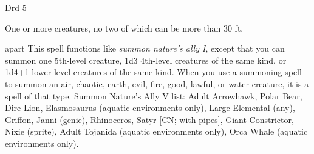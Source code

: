 
\begin{description*}
\item[Level:] Drd 5
\item[Effect:] One or more creatures, no two of which can be more than 30 ft.
\end{description*}

apart
This spell functions like \textit{summon nature's ally I}, except that you can
summon one 5th-level creature, 1d3 4th-level creatures of the same kind, or 1d4+1
lower-level creatures of the same kind.
When you use a summoning spell to summon an air, chaotic, earth, evil, fire, good,
lawful, or water creature, it is a spell of that type.
Summon Nature's Ally V list: Adult Arrowhawk, Polar Bear, Dire Lion, Elasmosaurus (aquatic environments only), Large Elemental (any), Griffon, Janni (genie), Rhinoceros, Satyr [CN; with pipes], Giant Constrictor, Nixie (sprite), Adult Tojanida (aquatic environments only), Orca Whale (aquatic environments only).